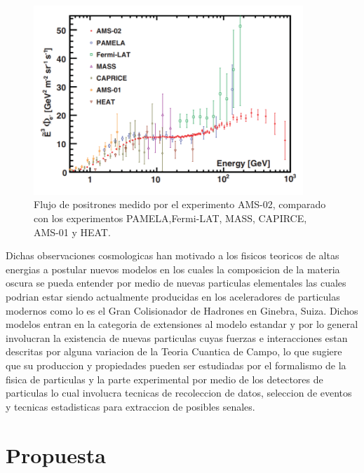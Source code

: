 \begin{figure}
\begin{center}
 \includegraphics[width=4.0in]{AMS_positronflux.png}
  \caption{Flujo de positrones medido por el experimento AMS-02, comparado con los experimentos PAMELA,Fermi-LAT, MASS, CAPIRCE, AMS-01 y HEAT.}
 \label{fig:AMS_positron}
 \end{center}
\end{figure}

Dichas observaciones cosmologicas han motivado a los fisicos teoricos de altas energias a postular nuevos modelos en los cuales la composicion de la materia oscura se pueda entender por medio de nuevas particulas elementales  las cuales podrian estar siendo actualmente producidas en los aceleradores de particulas modernos como lo es el Gran Colisionador de Hadrones en Ginebra, Suiza.  Dichos modelos entran en la categoria de extensiones al modelo estandar y por lo general involucran la existencia de nuevas particulas cuyas fuerzas e interacciones estan descritas por alguna variacion de la Teoria Cuantica de Campo, lo que sugiere que su produccion y propiedades pueden ser estudiadas por el formalismo de la fisica de particulas y la parte experimental por medio de los detectores de particulas lo cual involucra tecnicas de recoleccion de datos, seleccion de eventos y tecnicas estadisticas para extraccion de posibles senales.  

\chapter{Propuesta}


